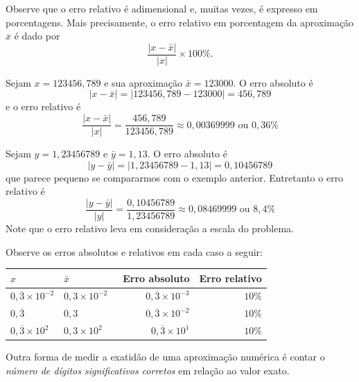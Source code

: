 \begin{obs}
  Observe que o erro relativo é adimensional e, muitas vezes, é expresso em porcentagens. Mais precisamente, o erro relativo em porcentagem da aproximação $\overline{x}$ é dado por
  \begin{equation*}
    \frac{|x-\bar{x}|}{|x|}\times 100 \%.
  \end{equation*}
\end{obs}

\begin{ex}
Sejam $x=123456,789$ e sua aproximação $\bar{x}=123000$. O erro absoluto é
$$
|x-\bar{x}|=|123456,789-123000|=456,789
$$
e o erro relativo é
$$
\frac{|x-\bar{x}|}{|x|}=\frac{456,789}{123456,789}\approx 0,00369999 \text{ ou }0,36\%
$$
\end{ex}

\begin{ex}
Sejam $y=1,23456789$ e $\bar{y}=1,13$. O erro absoluto é
$$
|y-\bar{y}|=|1,23456789-1,13|=0,10456789
$$
que parece pequeno se compararmos com o exemplo anterior. Entretanto o erro relativo é
$$
\frac{|y-\bar{y}|}{|y|}=\frac{0,10456789}{1,23456789}\approx 0,08469999 \text{ ou }8,4\%
$$
Note que o erro relativo leva em consideração a escala do problema.
\end{ex}



\begin{ex}
Observe os erros absolutos e relativos em cada caso a seguir:
\begin{center}
  \begin{tabular}{ll|rr} \hline
    $x$ & $\bar{x}$ &\ Erro absoluto & Erro relativo\\\hline
    $0,\overline{3}\times 10^{-2}$ & $0,3\times 10^{-2}$ & $0,\overline{3}\times 10^{-3}$ & $10\%$\\
    $0,\overline{3}$              & $0,3$ & $0,\overline{3}\times 10^{-2}$ & $10\%$\\
    $0,\overline{3}\times 10^{2}$ & $0,3\times 10^{2}$ & $0,\overline{3}\times 10^{1}$ & $10\%$\\\hline
\end{tabular}
\end{center}
\end{ex}

Outra forma de medir a exatidão de uma aproximação numérica é contar o \emph{número de dígitos significativos corretos} em relação ao valor exato.

